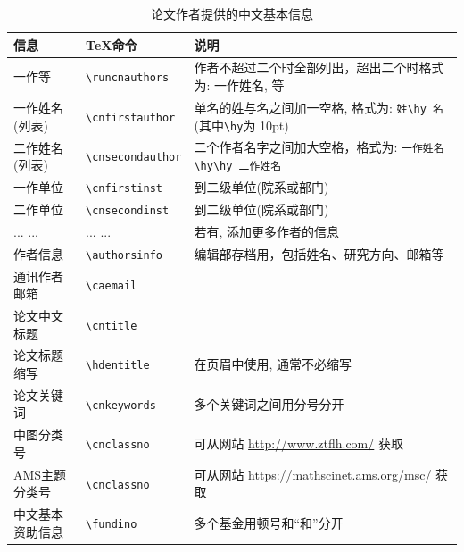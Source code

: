 \documentclass[Chinese]{APSart}
\begin{document}
\begin{enumerate}[leftmargin=7.8mm,itemsep=-0.1ex,label=(\arabic*)]
\begin{table}[H]
\centering{}
\caption{论文作者提供的中文基本信息\label{tab:cnart-metainfor}}
\begin{tabular}{lll}
\toprule
		信息         	 &  \TeX 命令              & 说明\\
\midrule
		一作等       	 & \verb/\runcnauthors/    & 作者不超过二个时全部列出，超出二个时格式为: 一作姓名, 等\\
		一作姓名(列表)   & \verb/\cnfirstauthor/   & 单名的姓与名之间加一空格, 格式为: \verb/姓\hy 名/ (其中\verb/\hy/为 10pt)\\ 
		二作姓名(列表)   & \verb/\cnsecondauthor/  & 二个作者名字之间加大空格，格式为: \verb/一作姓名\hy\hy 二作姓名/\\ 
		一作单位     	& \verb/\cnfirstinst/     & 到二级单位(院系或部门)\\ 
		二作单位     	& \verb/\cnsecondinst/    & 到二级单位(院系或部门)\\ 
		... ...     	& ... ...    			&  若有, 添加更多作者的信息\\ 
		作者信息      	& \verb/\authorsinfo/     &  编辑部存档用，包括姓名、研究方向、邮箱等\\
		通讯作者邮箱	   & \verb/\caemail/         & \\
		论文中文标题		 & \verb/\cntitle/        & \\
		论文标题缩写	   & \verb/\hdentitle/      & 在页眉中使用, 通常不必缩写\\
		论文关键词		& \verb/\cnkeywords/     & 多个关键词之间用分号分开\\
		中图分类号		& \verb/\cnclassno/      &  可从网站 \url{http://www.ztflh.com/} 获取\\
		AMS主题分类号       & \verb/\cnclassno/      & 可从网站 \url{https://mathscinet.ams.org/msc/} 获取\\
		中文基本资助信息  & \verb/\fundino/        &  多个基金用顿号和“和”分开\\
\bottomrule
\end{tabular}
\end{table}


\end{enumerate}
\end{document}
